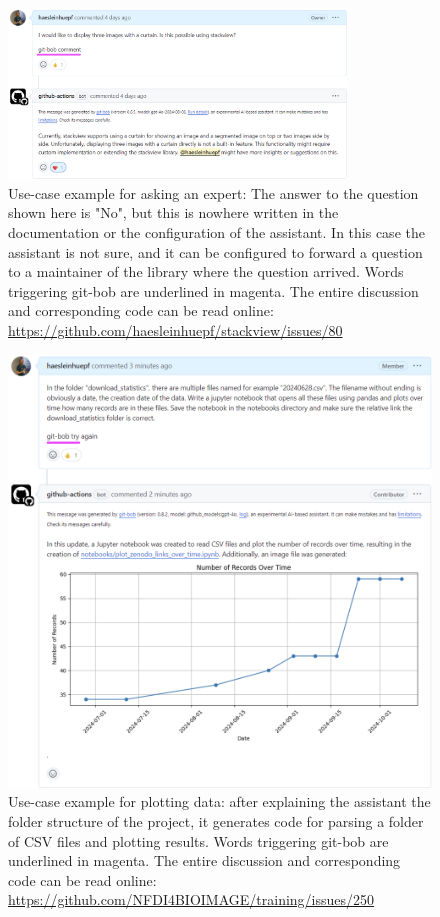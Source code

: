 \documentclass[times, twoside]{zHenriquesLab-StyleBioRxiv}
\begin{document}
\begin{figure}[h]
\centering
\includegraphics[width=0.8\textwidth]{example_supporting_users2.png}
\caption{Use-case example for asking an expert: The answer to the question shown here is "No", but this is nowhere written in the documentation or the configuration of the assistant. In this case the assistant is not sure, and it can be configured to forward a question to a maintainer of the library where the question arrived. Words triggering git-bob are underlined in magenta. The entire discussion and corresponding code can be read online: \url{https://github.com/haesleinhuepf/stackview/issues/80}
\newline
\newline
}
\label{fig:examplesupportingusers2}
\end{figure}


\begin{figure}[h]
\centering
\includegraphics[width=\textwidth]{example_plotting.png}
\caption{Use-case example for plotting data: after explaining the assistant the folder structure of the project, it generates code for parsing a folder of CSV files and plotting results. Words triggering git-bob are underlined in magenta. The entire discussion and corresponding code can be read online: \url{https://github.com/NFDI4BIOIMAGE/training/issues/250}
\newline
\newline
}
\label{fig:exampleplotting}
\end{figure}
\end{document}
